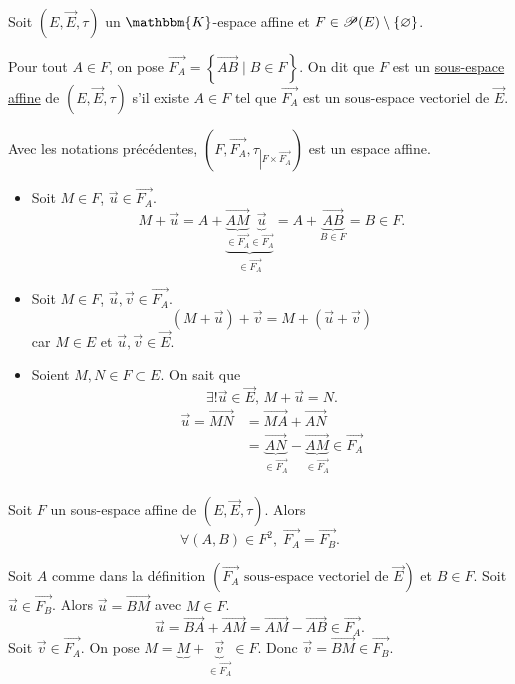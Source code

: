 \begin{defn}
	Soit $\left( E, \vec{E}, \tau \right)$ un $\mathbbm{K}$-espace affine et $F \in \mathcal{P}(E) \setminus \{\varnothing\}$.

	Pour tout $A \in F$, on pose $\vec{F_A} = \left\{\vec{AB}  \mid  B \in F\right\}$. On dit que $F$ est un \underline{sous-espace affine} de $\left( E, \vec{E}, \tau \right)$ s'il existe $A \in F$ tel que $\vec{F_A}$ est un sous-espace vectoriel de $\vec{E}$.
\end{defn}

\begin{prop}
	Avec les notations précédentes, $\left( F, \vec{F_A}, \tau_{\left|F \times \vec{F_A}\right.} \right)$ est un espace affine.
\end{prop}

\begin{prv}
	\begin{itemize}
		\item Soit $M \in F$, $\vec{u} \in \vec{F_A}$. \[
				M + \vec{u} = A + \underbrace{\underbrace{\vec{AM}}_{\displaystyle\in \vec{F_A}} \underbrace{\vec{u}}_{\displaystyle\in \vec{F_A}}}_{\displaystyle \in \vec{F_A}} = A + \underbrace{\vec{AB}}_{B \in F} = B \in F.
			\]
		\item Soit $M \in F$, $\vec{u}, \vec{v} \in \vec{F_A}$. \[
					\left(M + \vec{u}\right) + \vec{v} = M + \left(\vec{u} + \vec{v}\right)
			\] car $M \in E$ et $\vec{u}, \vec{v} \in \vec{E}$.
		\item Soient $M,N \in F \subset E$. On sait que \[
				\exists ! \vec{u} \in \vec{E},\, M + \vec{u} = N.
			\]
			\begin{align*}
				\vec{u} = \vec{MN} &= \vec{MA} + \vec{AN}\\
				&= \underbrace{\vec{AN}}_{\displaystyle\in \vec{F_A}} - \underbrace{\vec{AM}}_{\displaystyle\in  \vec{F_A}} \in \vec{F_A} \\
			\end{align*}
	\end{itemize}
\end{prv}

\begin{prop}
	Soit $F$ un sous-espace affine de $\left( E, \vec{E}, \tau \right)$. Alors \[
		\forall (A,B) \in F^2,\; \vec{F_A} = \vec{F_B}.
	\]
\end{prop}

\begin{prv}
	Soit $A$ comme dans la définition $\left( \vec{F_A} \text{ sous-espace vectoriel de } \vec{E} \right)$ et $B \in F$. Soit $\vec{u} \in \vec{F_B}$. Alors $\vec{u} = \vec{BM}$ avec $M \in F$. \[
		\vec{u} = \vec{BA} + \vec{AM} = \vec{AM} - \vec{AB} \in \vec{F_A}.
	\] Soit $\vec{v} \in \vec{F_A}$. On pose $M = \underbrace{M} + \underbrace{\vec{v}}_{\in \vec{F_A}} \in F$. Donc $\vec{v} = \vec{BM} \in \vec{F_B}$.
\end{prv}


